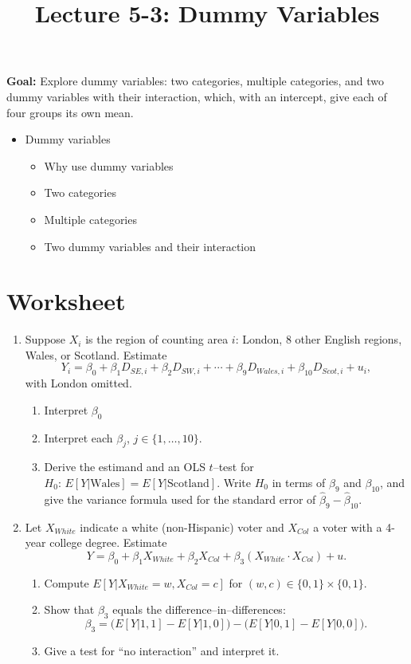 \documentclass[12pt]{article}
\title{\Large Lecture 5-3: Dummy Variables}
\author{}
\date{}
\begin{document}
\maketitle
\vspace{-6em}

\noindent \textbf{Goal:} Explore dummy variables: two categories, multiple categories, and two dummy variables with their interaction, which, with an intercept, give each of four groups its own mean.\medskip

\begin{itemize}\setlength{\itemsep}{1em}
\item Dummy variables
\begin{itemize}
\item Why use dummy variables
\item Two categories
\item Multiple categories
\item Two dummy variables and their interaction
\end{itemize}
\end{itemize}


\clearpage
\onehalfspacing

\section*{Worksheet}


\begin{enumerate}

\item Suppose $X_i$ is the region of counting area $i$: London, 8 other English regions, Wales, or Scotland. Estimate
\[
Y_i=\beta_0+\beta_1 D_{SE,i}+\beta_2 D_{SW,i}+\cdots+\beta_9 D_{Wales,i}+\beta_{10} D_{Scot,i}+u_i,
\]
with London omitted.
\begin{enumerate}\itemsep10em
    \item Interpret $\beta_0$
    \item Interpret each $\beta_j$, $j\in\{1,\ldots,10\}$.
    \item Derive the estimand and an OLS $t$–test for $H_0:\,E[Y|\text{Wales}]=E[Y|\text{Scotland}]$. Write $H_0$ in terms of $\beta_9$ and $\beta_{10}$, and give the variance formula used for the standard error of $\hat\beta_9-\hat\beta_{10}$.
\end{enumerate}
\clearpage

\item Let $X_{White}$ indicate a white (non-Hispanic) voter and $X_{Col}$ a voter with a 4-year college degree. Estimate
\[
Y=\beta_0+\beta_1 X_{White}+\beta_2 X_{Col}+\beta_3(X_{White}\cdot X_{Col})+u.
\]
\begin{enumerate}\itemsep10em
    \item Compute $E[Y|X_{White}=w,X_{Col}=c]$ for $(w,c)\in\{0,1\}\times \{0,1\}$.
    \item Show that $\beta_3$ equals the difference–in–differences:
    \[
    \beta_3=\big(E[Y|1,1]-E[Y|1,0]\big)-\big(E[Y|0,1]-E[Y|0,0]\big).
    \]
    \item Give a test for ``no interaction'' and interpret it.
\end{enumerate}

\end{enumerate}
\end{document}
